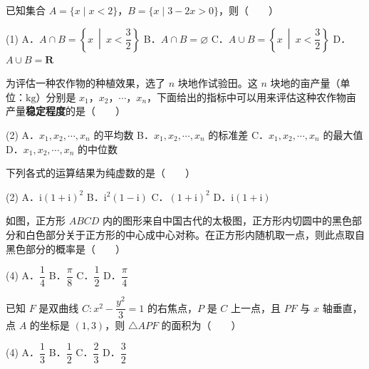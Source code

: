 \begin{question}
已知集合 $A=\{x\mid x<2\}$，$B=\{x\mid3-2x>0\}$，则\mbox{（　　）}

\begin{gkopts}(1)
\task A．$A\cap B=\left\{x\ \middle|\ x<\dfrac32\right\}$
\task B．$A\cap B=\varnothing$
\task C．$A\cup B=\left\{x\ \middle|\ x<\dfrac32\right\}$
\task D．$A\cup B=\mathbf R$
\end{gkopts}

\end{question}
\begin{question}
为评估一种农作物的种植效果，选了 $n$ 块地作试验田。这 $n$ 块地的亩产量（单位：$\mathrm{kg}$）分别是 $x_1$，$x_2$，$\cdots$，$x_n$，下面给出的指标中可以用来评估这种农作物亩产量\textbf{稳定程度}的是\mbox{（　　）}

\begin{gkopts}(2)
\task A．$x_1,x_2,\cdots,x_n$ 的平均数
\task B．$x_1,x_2,\cdots,x_n$ 的标准差
\task C．$x_1,x_2,\cdots,x_n$ 的最大值
\task D．$x_1,x_2,\cdots,x_n$ 的中位数
\end{gkopts}

\end{question}
\begin{question}
下列各式的运算结果为纯虚数的是\mbox{（　　）}

\begin{gkopts}(2)
\task A．$\mathrm i(1+\mathrm i)^{2}$
\task B．$\mathrm i^{2}(1-\mathrm i)$
\task C．$(1+\mathrm i)^{2}$
\task D．$\mathrm i(1+\mathrm i)$
\end{gkopts}

\Needspace{0.4\textheight}
\end{question}
\begin{question}
如图，正方形 $ABCD$ 内的图形来自中国古代的太极图，正方形内切圆中的黑色部分和白色部分关于正方形的中心成中心对称。在正方形内随机取一点，则此点取自黑色部分的概率是\mbox{（　　）}
\nopagebreak[4]
\begin{center}\end{center}
\nopagebreak[4]
\begin{gkopts}(4)
\task A．$\dfrac14$
\task B．$\dfrac\pi8$
\task C．$\dfrac12$
\task D．$\dfrac\pi4$
\end{gkopts}

\end{question}
\begin{question}
已知 $F$ 是双曲线 $C:x^{2}-\dfrac{y^{2}}3=1$ 的右焦点，$P$ 是 $C$ 上一点，且 $PF$ 与 $x$ 轴垂直，点 $A$ 的坐标是 $(1,3)$，则 $\triangle APF$ 的面积为\mbox{（　　）}

\begin{gkopts}(4)
\task A．$\dfrac13$
\task B．$\dfrac12$
\task C．$\dfrac23$
\task D．$\dfrac32$
\end{gkopts}

\Needspace{0.4\textheight}
\end{question}
